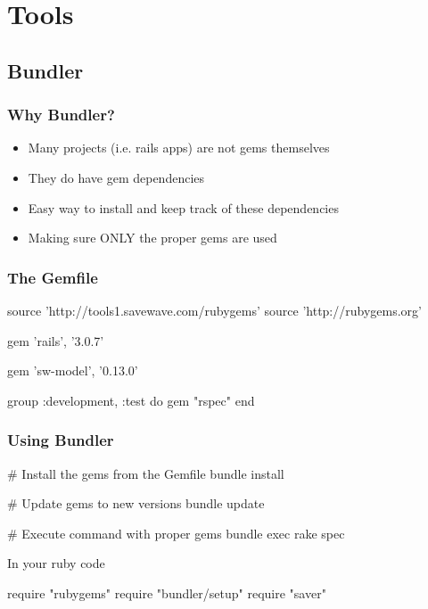 \section{Tools}

\subsection{Bundler}

\begin{frame}
  \frametitle{Why Bundler?}
  \begin{itemize}
  \item Many projects (i.e. rails apps) are not gems themselves
  \item They do have gem dependencies
  \pause
  \item Easy way to install and keep track of these dependencies
  \pause
  \item Making sure ONLY the proper gems are used
  \end{itemize}
\end{frame}

\begin{frame}[fragile]
  \frametitle{The Gemfile}
  \begin{rubycode}
    source 'http://tools1.savewave.com/rubygems'
    source 'http://rubygems.org'

    gem 'rails', '3.0.7'

    gem 'sw-model', '0.13.0'

    group :development, :test do
      gem "rspec"
    end
  \end{rubycode}
\end{frame}

\begin{frame}[fragile]
  \frametitle{Using Bundler}
  \begin{console}
    # Install the gems from the Gemfile
    bundle install

    # Update gems to new versions
    bundle update

    # Execute command with proper gems
    bundle exec rake spec
  \end{console}
  In your ruby code
  \begin{rubycode}
    require "rubygems"
    require "bundler/setup"
    require "saver"
  \end{rubycode}
\end{frame}


